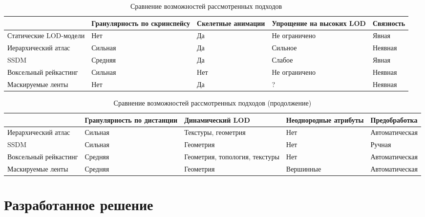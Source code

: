 \documentclass[12pt]{extarticle}
\begin{document}
\begin{table}[ht]
\small
\centering
\begin{tabular}{ p{24mm} | p{26mm} | p{18mm} | p{22mm} | p{16mm} }
                       & Гранулярность по скринспейсу & Скелетные анимации & Упрощение на высоких LOD & Связность \\
\hline
Статические LOD-модели & Нет                          & Да                 & Не ограничено            & Явная     \\
\hline
Иерархический атлас    & Сильная                      & Да                 & Сильное                  & Неявная   \\
\hline
SSDM                   & Средняя                      & Да                 & Слабое                   & Явная     \\
\hline
Воксельный рейкастинг  & Сильная                      & Нет                & Не ограничено            & Неявная   \\
\hline
Маскируемые ленты      & Нет                          & Да                 & ?                        & Неявная   \\
\end{tabular}
\caption{Сравнение возможностей рассмотренных подходов}
\end{table}

\begin{table}[ht]
\small
\centering
\begin{tabular}{ p{24mm} | p{24mm} | p{24mm} | p{24mm} | p{24mm} }
                      & Гранулярность по дистанции & Динамический LOD               & Неоднородные атрибуты & Предобработка \\
\hline
Иерархический атлас   & Сильная & Текстуры, геометрия            & Нет & Автоматическая \\
\hline
SSDM                  & Сильная & Геометрия                      & Нет & Ручная \\
\hline
Воксельный рейкастинг & Средняя & Геометрия, топология, текстуры & Нет & Автоматическая \\
\hline
Маскируемые ленты     & Средняя & Геометрия                      & Вершинные & Автоматическая \\
\end{tabular}
\caption{Сравнение возможностей рассмотренных подходов (продолжение)}
\end{table}


\section{Разработанное решение}
\label{sec:algorithm}
\end{document}
